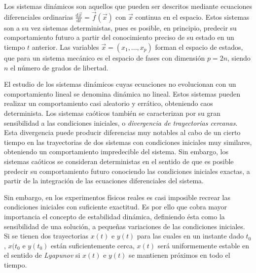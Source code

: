 

Los sistemas din\'amicos son aquellos que pueden ser descritos mediante ecuaciones diferenciales ordinarias $\frac{\mathrm{d}\vec{x}}{\mathrm{d}t} = \vec{f}(\vec{x})$ con $\vec{x}$ continua en el espacio. Estos sistemas son a su vez sistemas deterministas, pues es posible, en principio, predecir su comportamiento futuro a partir del conocimiento preciso de su estado en un tiempo $t$ anterior. Las variables $\vec{x} = (x_1,..., x_p)$ forman el espacio de estados, que para un sistema mec\'anico es el espacio de fases con dimensi\'on $p = 2n$, siendo $n$ el n\'umero de grados de libertad.

El estudio de los sistemas din\'amicos cuyas ecuaciones no evolucionan con un comportamiento lineal se denomina din\'amica no lineal. Estos sistemas pueden realizar un comportamiento casi aleatorio y err\'atico, obteniendo caos determinista. Los sistemas ca\'oticos tambi\'en se caracterizan por su gran sensibilidad a las condiciones iniciales, o \textit{divergencia de trayectorias cercanas}. Esta divergencia puede producir diferencias muy notables al cabo de un cierto tiempo en las trayectorias de dos sistemas con condiciones iniciales muy similares, obteniendo un comportamiento impredecible del sistema. Sin embargo, los sistemas ca\'oticos se consideran deterministas en el sentido de que es posible predecir su comportamiento futuro conociendo las condiciones iniciales exactas, a partir de la integraci\'on de las ecuaciones diferenciales del sistema.

Sin embargo, en los experimentos f\'isicos reales es casi imposible recrear las condiciones iniciales con suficiente exactitud. Es por ello que cobra mayor importancia el concepto de estabilidad din\'amica, definiendo \'esta como la sensibilidad de una soluci\'on, a pequeñas variaciones de las condiciones iniciales. Si se tienen dos trayectorias $x(t)$ e $y(t)$ para las cuales en un instante dado $t_0$, $x(t_0$ e $y(t_0)$ est\'an suficientemente cerca, $x(t)$ ser\'a uniformemente estable en el sentido de \textit{Lyapunov} si $x(t)$ e $y(t)$ se mantienen pr\'oximos en todo el tiempo.

